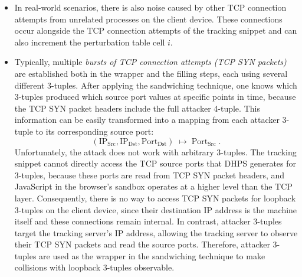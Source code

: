 \documentclass{report}
\begin{document}
\begin{itemize}
    \item {} In real-world scenarios, there is also \alert{noise} caused by other TCP connection attempts from unrelated processes on the client device. These connections occur alongside the TCP connection attempts of the tracking snippet and can also increment the perturbation table cell \( i \).%
    \item {} Typically, multiple \emph{bursts of TCP connection attempts (TCP SYN packets)} are established both in the wrapper and the filling steps, each using several different 3-tuples. After applying the sandwiching technique, one knows which 3-tuples produced which source port values at specific points in time, because the \alert{TCP SYN packet headers} include the full attacker 4-tuple. This information can be easily transformed into a mapping from each attacker 3-tuple to its corresponding source port:
      \[
        (\mathrm{IP_{Src}}, \mathrm{IP_{Dst}}, \mathrm{Port_{Dst}}) \;\mapsto\; \mathrm{Port_{Src}}\;\text{.}
      \]
     Unfortunately, the attack does not work with arbitrary 3-tuples. The tracking snippet cannot directly access the TCP source ports that DHPS generates for 3-tuples, because these ports are read from TCP SYN packet headers, and JavaScript in the \alert{browser’s sandbox} operates at a higher level than the TCP layer. Consequently, there is no way to access TCP SYN packets for \alert{loopback 3-tuples} on the client device, since their destination IP address is the machine itself and these connections remain internal. In contrast, \alert{attacker 3-tuples} target the tracking server’s IP address, allowing the \alert{tracking server} to observe their TCP SYN packets and read the source ports. Therefore, attacker 3-tuples are used as the wrapper in the sandwiching technique to make collisions with loopback 3-tuples observable.
\end{itemize}
\end{document}
